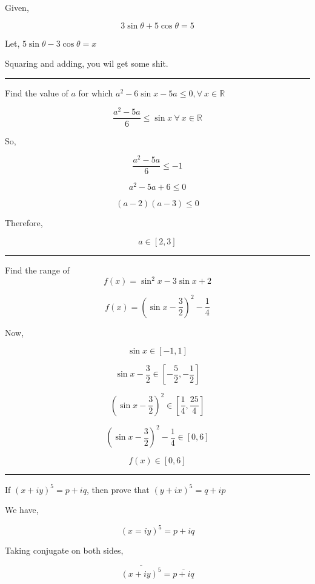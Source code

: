 \documentclass[twocolumn]{article}
\begin{document}
\begin{CJK*}{UTF8}{gbsn}
Given, 

\[
    3\sin \theta + 5\cos \theta = 5
\]

Let, \(5\sin \theta  - 3\cos \theta  = x\)

\vspace*{0.1in}
Squaring and adding, you wil get some shit.
\vspace*{0.1in}

\hrule 

\begin{question}
    Find the value of \(a\) for which \(a^{2} - 6\sin x - 5a \le 0, \forall\ x \in \mathbb{R} \) 
\end{question}

\[
    \frac{a^{2}  - 5a}{6} \le \sin x\ \forall\ x \in \mathbb{R}
\]

So, 

\[
    \frac{a^{2}  - 5a}{6} \le - 1
\]

\[
    a^{2}  - 5a + 6 \le 0
\]

\[
    (a-2)(a-3) \le 0
\]

Therefore, 

\[
    a \in [2, 3]
\]

\hrule 

\begin{question}
    Find the range of 
    \[
        f(x) = \sin ^{2} x - 3 \sin x + 2
    \]
\end{question}

\[
    f(x) = (\sin x - \frac{3}{2})^{2} - \frac{1}{4}
\]

Now, 

\[
    \sin x \in [-1, 1]
\]

\[
    \sin x - \frac{3}{2} \in [-\frac{5}{2}, -\frac{1}{2}]
\]

\[
    (\sin x - \frac{3}{2})^{2} \in [\frac{1}{4}, \frac{25}{4}]
\]

\[
    (\sin x - \frac{3}{2})^{2} - \frac{1}{4} \in [0, 6]
\]

\[
    \boxed{f(x) \in [0, 6]}
\]

\hrule 

\begin{question}
    If \((x + iy)^5 = p + iq\), then prove that \((y + ix)^5 = q + ip\)
\end{question}

We have, 

\[
    (x = iy)^5 = p + iq 
\]

Taking conjugate on both sides,

\[
    \overline{(x + iy)^5} = \overline{p + iq}
\]


\end{CJK*}
\end{document}
